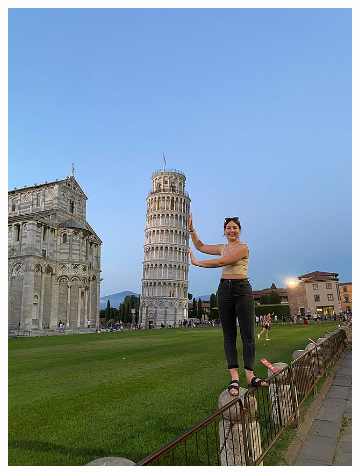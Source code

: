 \documentclass[%
reprint,
twocolumn,
nofootinbib,
 amsmath,amssymb,
 aps,
]{revtex4-2}
\begin{document}
\begin{figure}[H]
\begin{subfigure}{0.23\textwidth}
        \includegraphics[width=0.98\linewidth]{img/pisa-tourist.jpg}
    \end{subfigure}
    \begin{subfigure}{0.23\textwidth}

\end{subfigure}
\end{figure}
\end{document}

